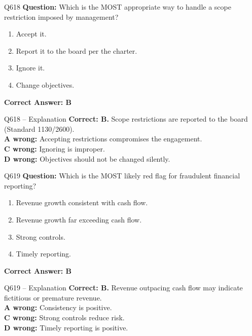 \documentclass[aspectratio=169,10pt]{beamer}
\begin{document}
	\begin{frame}[t]{Q618}
		\small
		\textbf{Question:} Which is the MOST appropriate way to handle a scope restriction imposed by management?
		\begin{enumerate}[label=\Alph*.,itemsep=1pt,topsep=2pt]
			\item Accept it.
			\item Report it to the board per the charter.
			\item Ignore it.
			\item Change objectives.
		\end{enumerate}
		\vspace{4pt}
		\textbf{Correct Answer: B}
	\end{frame}
	
	\begin{frame}[t]{Q618 -- Explanation}
		\small
		\textbf{Correct: B.} Scope restrictions are reported to the board (Standard 1130/2600). \\[4pt]
		\textbf{A wrong:} Accepting restrictions compromises the engagement. \\[2pt]
		\textbf{C wrong:} Ignoring is improper. \\[2pt]
		\textbf{D wrong:} Objectives should not be changed silently.
	\end{frame}
	
	\begin{frame}[t]{Q619}
		\small
		\textbf{Question:} Which is the MOST likely red flag for fraudulent financial reporting?
		\begin{enumerate}[label=\Alph*.,itemsep=1pt,topsep=2pt]
			\item Revenue growth consistent with cash flow.
			\item Revenue growth far exceeding cash flow.
			\item Strong controls.
			\item Timely reporting.
		\end{enumerate}
		\vspace{4pt}
		\textbf{Correct Answer: B}
	\end{frame}
	
	\begin{frame}[t]{Q619 -- Explanation}
		\small
		\textbf{Correct: B.} Revenue outpacing cash flow may indicate fictitious or premature revenue. \\[4pt]
		\textbf{A wrong:} Consistency is positive. \\[2pt]
		\textbf{C wrong:} Strong controls reduce risk. \\[2pt]
		\textbf{D wrong:} Timely reporting is positive.
	\end{frame}
	
\end{document}
